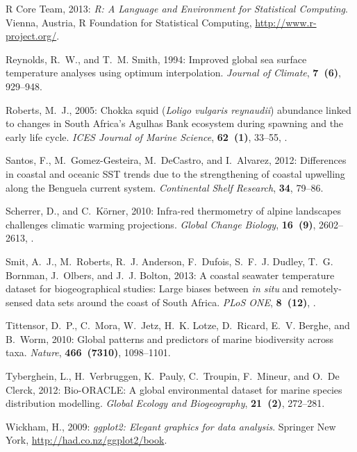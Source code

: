 \documentclass{ametsoc}
\begin{document}
\begin{thebibliography}{23}
{R Core Team}, 2013: \textit{{R: A Language and Environment for Statistical
  Computing}}. Vienna, Austria, R Foundation for Statistical Computing,
  \urlprefix\url{http://www.r-project.org/}.

Reynolds, R.~W., and T.~M. Smith, 1994: {Improved global sea surface
  temperature analyses using optimum interpolation}. \textit{Journal of
  Climate}, \textbf{7~(6)}, 929--948.

Roberts, M.~J., 2005: {Chokka squid (\textit{Loligo vulgaris reynaudii}) abundance
  linked to changes in South Africa's Agulhas Bank ecosystem during spawning
  and the early life cycle}. \textit{ICES Journal of Marine Science},
  \textbf{62~(1)}, 33--55, .

Santos, F., M.~Gomez-Gesteira, M.~DeCastro, and I.~Alvarez, 2012: {Differences
  in coastal and oceanic SST trends due to the strengthening of coastal
  upwelling along the Benguela current system}. \textit{Continental Shelf
  Research}, \textbf{34}, 79--86.

Scherrer, D., and C.~K{\"{o}}rner, 2010: {Infra-red thermometry of alpine
  landscapes challenges climatic warming projections}. \textit{Global Change
  Biology}, \textbf{16~(9)}, 2602--2613,
  .

Smit, A.~J., M.~Roberts, R.~J. Anderson, F.~Dufois, S.~F.~J. Dudley, T.~G.
  Bornman, J.~Olbers, and J.~J. Bolton, 2013: {A coastal seawater temperature
  dataset for biogeographical studies: Large biases between \textit{in situ} and
  remotely-sensed data sets around the coast of South Africa}. \textit{PLoS
  ONE}, \textbf{8~(12)}, .

Tittensor, D.~P., C.~Mora, W.~Jetz, H.~K. Lotze, D.~Ricard, E.~V. Berghe, and
  B.~Worm, 2010: {Global patterns and predictors of marine biodiversity across
  taxa}. \textit{Nature}, \textbf{466~(7310)}, 1098--1101.

Tyberghein, L., H.~Verbruggen, K.~Pauly, C.~Troupin, F.~Mineur, and O.~{De
  Clerck}, 2012: {Bio-ORACLE: A global environmental dataset for marine species
  distribution modelling}. \textit{Global Ecology and Biogeography},
  \textbf{21~(2)}, 272--281.

Wickham, H., 2009: \textit{ggplot2: Elegant graphics for data analysis}.
  Springer New York, \urlprefix\url{http://had.co.nz/ggplot2/book}.

\end{thebibliography}
\end{document}
